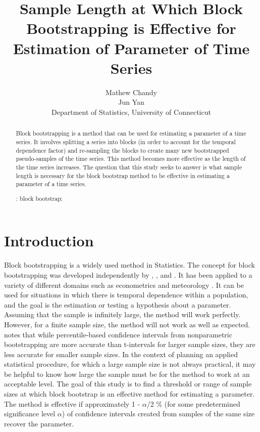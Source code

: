 \documentclass[12pt, letterpaper, titlepage]{article}
\title{Sample Length at Which Block Bootstrapping is Effective for Estimation of Parameter of Time Series}
\author{Mathew Chandy\\
  Jun Yan\\[1ex]
  Department of Statistics, University of Connecticut\\
}
\date{}
\begin{document}
 
\maketitle

\doublespace

\begin{abstract}
Block bootstrapping is a method that can be used for estimating a parameter of a time
series. It involves splitting a series into blocks (in order to account for the temporal dependence
factor) and re-sampling the blocks to create many new bootstrapped pseudo-samples of the time series.
This method becomes more effective as the length of the time series increases. 
The question that this study seeks to answer is what sample length is necessary for the block
bootstrap method to be effective in estimating a parameter of a time
series.

\bigskip
\noindent{}:
block bootstrap;
\end{abstract}

\section{Introduction}
\label{sec:intro}

Block bootstrapping is a widely used method in Statistics. The concept for block 
bootstrapping was developed independently by \citet{hall1985resampling}, \citet{carlstein1986use}, and 
\citet{kunsch1989jackknife}. \citet{radovanov2014comparison} It has been applied to a variety of 
different domains such 
as econometrics \citep{mackinnon2006bootstrap} and meteorology \citep{varga2017generalised}. It can be used for 
situations in which there is temporal dependence within a population, and the goal is the estimation or testing a hypothesis about a parameter. Assuming that the sample is infinitely 
large, the method will work perfectly. However, for a finite sample size, the method will 
not work as well as expected. \citet{hesterberg2015teachers} notes that while percentile-based confidence intervals from nonparametric bootstrapping are more accurate than t-intervals for larger sample sizes, they are less accurate for smaller sample sizes. In the context of planning an applied 
statistical procedure, for which a large sample size is not always practical, it may be helpful to know how large the sample must be for the method to work at an acceptable level. 
The goal of this study is to find a threshold or range of sample sizes at which block bootstrap 
is an effective method for estimating a parameter. The method is effective if approximately 1 - $\alpha$/2 \% (for some predetermined significance level $\alpha$) of confidence intervals created from samples of the same size recover the parameter.
\end{document}
